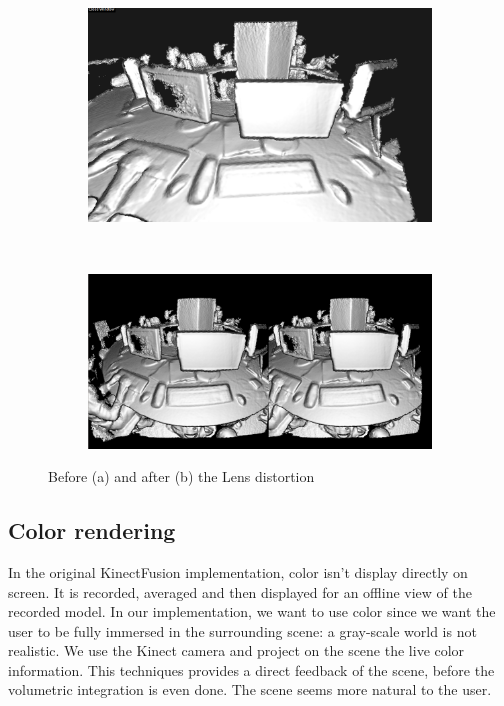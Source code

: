 \documentclass[12pt]{article}
\begin{document}
\begin{figure}[h]
        \centering
        \begin{subfigure}[t]{0.6\textwidth}
                \includegraphics[width=1\textwidth]{BefDistort.png}
                \caption{}
        \end{subfigure}~\\
        \begin{subfigure}[t]{0.6\textwidth}
                \includegraphics[width=1\textwidth]{AftDistort.png}
                \caption{}
        \end{subfigure}
        \caption{\label{fig:distortcomp}Before (a) and after (b) the Lens distortion}
        \par
\end{figure}

\subsection{Color rendering}
In the original KinectFusion implementation, color isn't display directly on screen. It is recorded, averaged and then displayed for an offline view of the recorded model. In our implementation, we want to use color since we want the user to be fully immersed in the surrounding scene: a gray-scale world is not realistic. We use the Kinect camera and project on the scene the live color information. This techniques provides a direct feedback of the scene, before the volumetric integration is even done. The scene seems more natural to the user.
\end{document}
